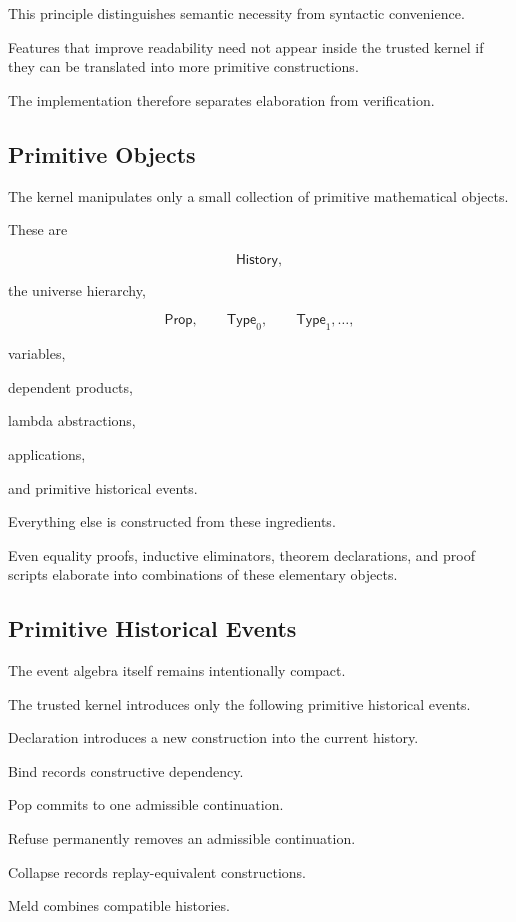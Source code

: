 \documentclass[12pt,oneside]{article}
\theoremstyle{definition}
\theoremstyle{remark}
\newcommand{\Type}{\mathsf{Type}}
\newcommand{\Prop}{\mathsf{Prop}}
\begin{document}
This principle distinguishes semantic necessity from syntactic convenience.

Features that improve readability need not appear inside the trusted kernel if
they can be translated into more primitive constructions.

The implementation therefore separates elaboration from verification.

\subsection{Primitive Objects}

The kernel manipulates only a small collection of primitive mathematical
objects.

These are

\[
\mathsf{History},
\]

the universe hierarchy,

\[
\Prop,
\qquad
\Type_0,
\qquad
\Type_1,
\ldots,
\]

variables,

dependent products,

lambda abstractions,

applications,

and primitive historical events.

Everything else is constructed from these ingredients.

Even equality proofs, inductive eliminators, theorem declarations, and proof
scripts elaborate into combinations of these elementary objects.

\subsection{Primitive Historical Events}

The event algebra itself remains intentionally compact.

The trusted kernel introduces only the following primitive historical events.

Declaration introduces a new construction into the current history.

Bind records constructive dependency.

Pop commits to one admissible continuation.

Refuse permanently removes an admissible continuation.

Collapse records replay-equivalent constructions.

Meld combines compatible histories.
\end{document}
